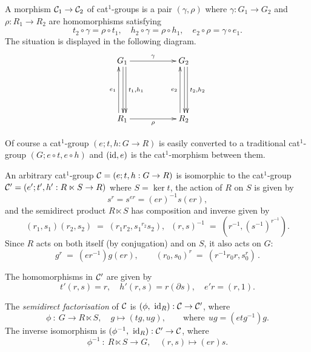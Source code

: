 A morphism  $\mathcal{C}_1 \to \mathcal{C}_2$  
of cat$^1$-groups is a pair  $(\gamma, \rho)$  where
$\gamma : G_1 \to G_2$  and  $\rho : R_1 \to R_2$  
are homomorphisms satisfying
\begin{equation} \label{eq:cat1mor}
t_2 \circ\gamma = \rho\circ t_1, \quad
h_2 \circ\gamma = \rho\circ h_1, \quad
e_2 \circ\rho = \gamma\circ e_1.
\end{equation}
The situation is displayed in the following diagram. 
\begin{equation*} \label{eq:cat1mordiag}
\vcenter{\xymatrix{
   G_1 \ar[rr]^{\gamma} \ar[dd]<1.0ex>^{t_1,h_1} \ar[dd]<0.2ex> 
     && G_2 \ar[dd]<1.0ex>^{t_2,h_2} \ar[dd]<0.2ex>\\
     &&  \\
   R_1 \ar[rr]_{\rho} \ar[uu]<1.0ex>^{e_1} 
     && R_2 \ar[uu]<1.0ex>^{e_2}
}}
\end{equation*}

Of course a cat$^1$-group $(e;t,h : G \to R)$ is easily converted 
to a traditional cat$^1$-group $(G;e \circ t, e \circ h)$ and $(\mathrm{id},e)$ 
is the cat$^1$-morphism between them. 

An arbitrary cat$^1$-group  $\mathcal{C} = (e;t,h : G \to R)$
is isomorphic to the cat$^1$-group
$\mathcal{C}' = (e';t',h' : R \ltimes S \to R)$
where  $S = \ker t$,  
the action of $R$ on $S$ is given by
$$
s^r = s^{er} = (er)^{-1} s (er),
$$
and the semidirect product  $R \ltimes S$  
has composition and inverse given by
$$
(r_1,s_1)(r_2,s_2) \; = \; (r_1r_2,{s_1}^{r_2}s_2), \;\;
(r,s)^{-1}  \; = \; (r^{-1}, (s^{-1})^{r^{-1}}).
$$
Since $R$ acts on both itself (by conjugation) and on $S$,
it also acts on $G$:
\begin{equation} \label{eq:RactsonG}
g^r ~=~ (er^{-1})g(er),  \quad\quad
(r_0,s_0)^r ~=~ (r^{-1}r_0r, s_0^r)\,.
\end{equation}

\noindent
The homomorphisms in  $\mathcal{C}'$  are given by
\begin{equation} \label{eq:sdpcat1}
t'(r,s) = r, \quad h'(r,s) = r(\partial s), \quad e'r = (r,1).
\end{equation}

\begin{defn} 
The \emph{semidirect factorisation} of $\mathcal{C}$ is 
$(\phi, ~\mathrm{id}_R) : \mathcal{C} \to \mathcal{C}'$, where
\begin{equation} \label{eq:cat1-sdp-fact} 
\phi ~:~ G \to R \ltimes S, \quad g \mapsto (tg,ug),
\qquad\mbox{where}~~  ug = (etg^{-1})g. 
\end{equation}
The inverse isomorphism is  $(\phi^{-1}, ~\mathrm{id}_R) : \mathcal{C}' \to \mathcal{C}$, where 
$$
\phi^{-1} ~:~ R \ltimes S \to G, \quad (r,s) \mapsto (er)s.
$$ 
\end{defn}

